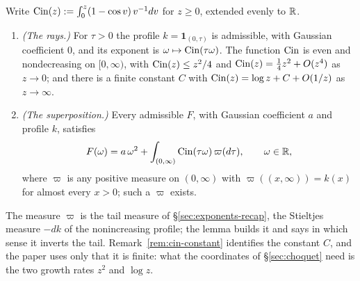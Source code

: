 \begin{lemma}\label{lem:cin-rays}
Write $\operatorname{Cin}(z) := \int_0^z (1 - \cos v)\,v^{-1}dv$ for $z \ge 0$, extended evenly to $\mathbb{R}$.
\begin{enumerate}
\item \emph{(The rays.)} For $\tau > 0$ the profile $k = \mathbf 1_{(0,\tau)}$ is admissible,
with Gaussian coefficient $0$, and its exponent is $\omega \mapsto \operatorname{Cin}(\tau\omega)$. The
function $\operatorname{Cin}$ is even and nondecreasing on $[0,\infty)$, with $\operatorname{Cin}(z) \le z^2/4$ and
$\operatorname{Cin}(z) = \tfrac14 z^2 + O(z^4)$ as $z \to 0$; and there is a finite constant $C$ with
$\operatorname{Cin}(z) = \log z + C + O(1/z)$ as $z \to \infty$.
\item \emph{(The superposition.)} Every admissible $F$, with Gaussian coefficient $a$ and
profile $k$, satisfies
\begin{equation}\label{eq:cone-superposition}
  F(\omega) = a\,\omega^2 + \int_{(0,\infty)} \operatorname{Cin}(\tau\omega)\,\varpi(d\tau),
  \qquad \omega \in \mathbb{R},
\end{equation}
where $\varpi$ is any positive measure on $(0,\infty)$ with $\varpi((x,\infty)) = k(x)$ for
almost every $x > 0$; such a $\varpi$ exists.
\end{enumerate}
\end{lemma}

The measure $\varpi$ is the tail measure of \S\ref{sec:exponents-recap}, the Stieltjes measure
$-dk$ of the nonincreasing profile; the lemma builds it and says in which sense it inverts
the tail. Remark~\ref{rem:cin-constant} identifies the constant $C$, and the paper uses
only that it is finite: what the coordinates of \S\ref{sec:choquet} need is the two growth
rates $z^2$ and $\log z$.

